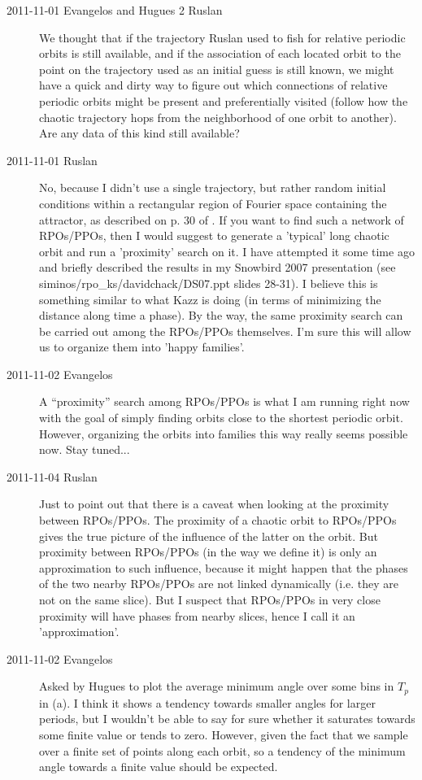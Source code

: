 \begin{description}
\item[2011-11-01 Evangelos and Hugues 2 Ruslan] We thought that if the
trajectory Ruslan used to fish for relative periodic orbits is still
available, and if the association of each located orbit to the point on
the trajectory used as an initial guess is still known, we might have a
quick and dirty way to figure out which connections of relative periodic
orbits might be present and preferentially visited (follow how the
chaotic trajectory hops from the neighborhood of one orbit to another).
Are any data of this kind still available?

\item[2011-11-01 Ruslan] No, because I didn't use a single trajectory,
but rather random initial conditions within a rectangular region of
Fourier space containing the attractor, as described on p. 30 of
. If you want to find such a network of RPOs/PPOs, then I would
suggest to generate a 'typical' long chaotic orbit and run a 'proximity'
search on it.  I have attempted it some time ago and briefly described
the results in my Snowbird 2007 presentation (see
siminos/rpo\_ks/davidchack/DS07.ppt slides 28-31).  I believe this is
something similar to what Kazz is doing (in terms of minimizing the
distance along time a phase).  By the way, the same proximity search can
be carried out among the RPOs/PPOs themselves. I'm sure this will allow
us to organize them into 'happy families'.

\item[2011-11-02 Evangelos] A ``proximity'' search among RPOs/PPOs is
what I am running right now with the goal of simply finding orbits close
to the shortest periodic orbit. However, organizing the orbits into
families this way really seems possible now. Stay tuned...

\item[2011-11-04 Ruslan] Just to point out that there is a caveat when
looking at the proximity between RPOs/PPOs.  The proximity of a chaotic
orbit to RPOs/PPOs gives the true picture of the influence of the latter
on the orbit. But proximity between RPOs/PPOs (in the way we define it)
is only an approximation to such influence, because it might happen that
the phases of the two nearby RPOs/PPOs are not linked dynamically (i.e.
they are not on the same slice).  But I suspect that RPOs/PPOs in very
close proximity will have phases from nearby slices, hence I call it an
'approximation'.

\item[2011-11-02 Evangelos] Asked by Hugues to plot the average minimum
angle over some bins in $T_p$ in (a). I
think it shows a tendency towards smaller angles for larger periods, but
I wouldn't be able to say for sure whether it saturates towards some
finite value or tends to zero. However, given the fact that we sample
over a finite set of points along each orbit, so a tendency of the
minimum angle towards a finite value should be expected.


\end{description}
